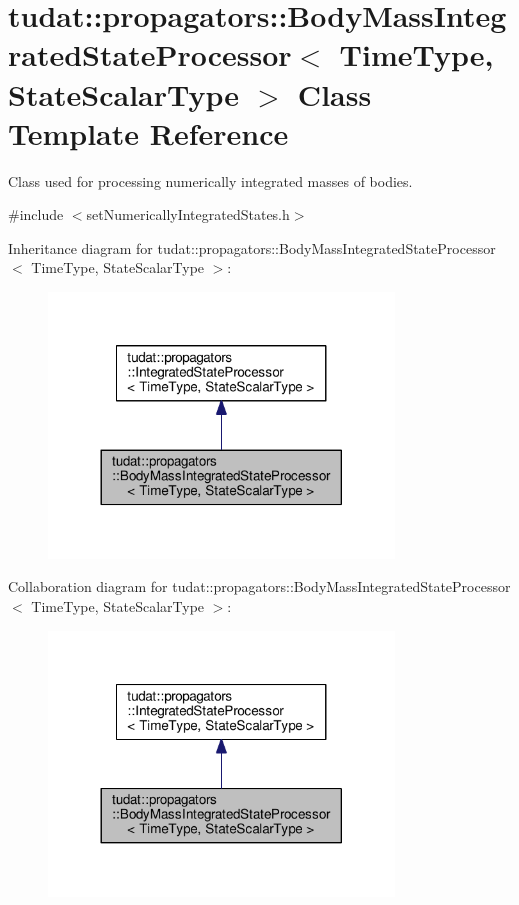 \hypertarget{classtudat_1_1propagators_1_1BodyMassIntegratedStateProcessor}{}\section{tudat\+:\+:propagators\+:\+:Body\+Mass\+Integrated\+State\+Processor$<$ Time\+Type, State\+Scalar\+Type $>$ Class Template Reference}
\label{classtudat_1_1propagators_1_1BodyMassIntegratedStateProcessor}


Class used for processing numerically integrated masses of bodies.  




{\ttfamily \#include $<$set\+Numerically\+Integrated\+States.\+h$>$}



Inheritance diagram for tudat\+:\+:propagators\+:\+:Body\+Mass\+Integrated\+State\+Processor$<$ Time\+Type, State\+Scalar\+Type $>$\+:
\nopagebreak
\begin{figure}[H]
\begin{center}
\leavevmode
\includegraphics[width=260pt]{classtudat_1_1propagators_1_1BodyMassIntegratedStateProcessor__inherit__graph}
\end{center}
\end{figure}


Collaboration diagram for tudat\+:\+:propagators\+:\+:Body\+Mass\+Integrated\+State\+Processor$<$ Time\+Type, State\+Scalar\+Type $>$\+:
\nopagebreak
\begin{figure}[H]
\begin{center}
\leavevmode
\includegraphics[width=260pt]{classtudat_1_1propagators_1_1BodyMassIntegratedStateProcessor__coll__graph}
\end{center}
\end{figure}
